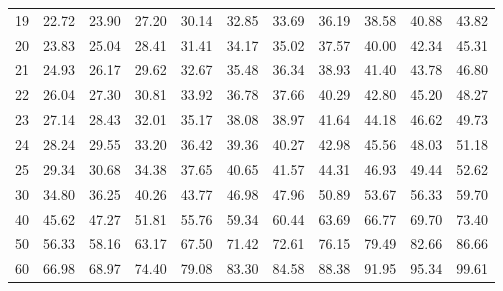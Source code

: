 \begin{center}
\begin{minipage}{5in}
\begin{center}
\begin{tabular}{|r|rrrrrrrrrr|}
\\\cellcolor{lightgray}	19	&\cellcolor{lightgray}	22.72	&\cellcolor{lightgray}	23.90	&\cellcolor{lightgray}	27.20	&\cellcolor{lightgray}	30.14	&\cellcolor{lightgray}	32.85	&\cellcolor{lightgray}	33.69	&\cellcolor{lightgray}	36.19	&\cellcolor{lightgray}	38.58	&\cellcolor{lightgray}	40.88	&\cellcolor{lightgray}	43.82
\\\cellcolor{lightgray}	20	&\cellcolor{lightgray}	23.83	&\cellcolor{lightgray}	25.04	&\cellcolor{lightgray}	28.41	&\cellcolor{lightgray}	31.41	&\cellcolor{lightgray}	34.17	&\cellcolor{lightgray}	35.02	&\cellcolor{lightgray}	37.57	&\cellcolor{lightgray}	40.00	&\cellcolor{lightgray}	42.34	&\cellcolor{lightgray}	45.31
\\	21	&	24.93	&	26.17	&	29.62	&	32.67	&	35.48	&	36.34	&	38.93	&	41.40	&	43.78	&	46.80
\\	22	&	26.04	&	27.30	&	30.81	&	33.92	&	36.78	&	37.66	&	40.29	&	42.80	&	45.20	&	48.27
\\	23	&	27.14	&	28.43	&	32.01	&	35.17	&	38.08	&	38.97	&	41.64	&	44.18	&	46.62	&	49.73
\\	24	&	28.24	&	29.55	&	33.20	&	36.42	&	39.36	&	40.27	&	42.98	&	45.56	&	48.03	&	51.18
\\	25	&	29.34	&	30.68	&	34.38	&	37.65	&	40.65	&	41.57	&	44.31	&	46.93	&	49.44	&	52.62
\\\cellcolor{lightgray}	30	&\cellcolor{lightgray}	34.80	&\cellcolor{lightgray}	36.25	&\cellcolor{lightgray}	40.26	&\cellcolor{lightgray}	43.77	&\cellcolor{lightgray}	46.98	&\cellcolor{lightgray}	47.96	&\cellcolor{lightgray}	50.89	&\cellcolor{lightgray}	53.67	&\cellcolor{lightgray}	56.33	&\cellcolor{lightgray}	59.70
\\\cellcolor{lightgray}	40	&\cellcolor{lightgray}	45.62	&\cellcolor{lightgray}	47.27	&\cellcolor{lightgray}	51.81	&\cellcolor{lightgray}	55.76	&\cellcolor{lightgray}	59.34	&\cellcolor{lightgray}	60.44	&\cellcolor{lightgray}	63.69	&\cellcolor{lightgray}	66.77	&\cellcolor{lightgray}	69.70	&\cellcolor{lightgray}	73.40
\\\cellcolor{lightgray}	50	&\cellcolor{lightgray}	56.33	&\cellcolor{lightgray}	58.16	&\cellcolor{lightgray}	63.17	&\cellcolor{lightgray}	67.50	&\cellcolor{lightgray}	71.42	&\cellcolor{lightgray}	72.61	&\cellcolor{lightgray}	76.15	&\cellcolor{lightgray}	79.49	&\cellcolor{lightgray}	82.66	&\cellcolor{lightgray}	86.66
\\\cellcolor{lightgray}	60	&\cellcolor{lightgray}	66.98	&\cellcolor{lightgray}	68.97	&\cellcolor{lightgray}	74.40	&\cellcolor{lightgray}	79.08	&\cellcolor{lightgray}	83.30	&\cellcolor{lightgray}	84.58	&\cellcolor{lightgray}	88.38	&\cellcolor{lightgray}	91.95	&\cellcolor{lightgray}	95.34	&\cellcolor{lightgray}	99.61

\end{tabular}
\end{center}
\end{minipage}
\end{center}
